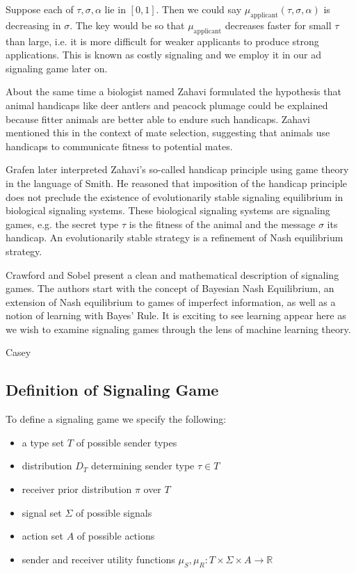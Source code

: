 \documentclass{article}
\begin{document}
Suppose each of $\tau, \sigma, \alpha$ lie in $[0,1]$. Then we could say $\mu_{\text{applicant}}(\tau, \sigma, \alpha)$ is decreasing in $\sigma$. The key would be so that $\mu_{\text{applicant}}$ decreases faster for small $\tau$ than large, i.e. it is more difficult for weaker applicants to produce strong applications. This is known as costly signaling and we employ it in our ad signaling game later on.

About the same time a biologist named Zahavi \cite{zahavi1} formulated the hypothesis that animal handicaps like deer antlers and peacock plumage could be explained because fitter animals are better able to endure such handicaps. Zahavi mentioned this in the context of mate selection, suggesting that animals use handicaps to communicate fitness to potential mates.

Grafen\cite{grafen1} later interpreted Zahavi's so-called handicap principle using game theory in the language of Smith\cite{smith1982evolution}. He reasoned that imposition of the handicap principle does not preclude the existence of evolutionarily stable signaling equilibrium in biological signaling systems. These biological signaling systems are signaling games, e.g. the secret type $\tau$ is the fitness of the animal and the message $\sigma$ its handicap. An evolutionarily stable strategy is a refinement of Nash equilibrium strategy.

Crawford and Sobel\cite{crawford1982strategic} present a clean and mathematical description of signaling games. The authors start with the concept of Bayesian Nash Equilibrium, an extension of Nash equilibrium to games of imperfect information, as well as a notion of learning with Bayes' Rule. It is exciting to see learning appear here as we wish to examine signaling games through the lens of machine learning theory.

Casey\cite{casey1} 

\subsection{Definition of Signaling Game}
To define a signaling game we specify the following:
\begin{itemize}
    \item a type set $T$ of possible sender types
    \item distribution $D_T$ determining sender type $\tau \in T$
    \item receiver prior distribution $\pi$ over $T$
    \item signal set $\Sigma$ of possible signals
    \item action set $A$ of possible actions
    \item sender and receiver utility functions $\mu_S, \mu_R: T \times \Sigma \times A \longrightarrow \mathbb{R}$
\end{itemize}
\end{document}
